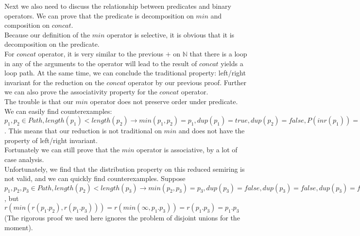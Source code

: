 \documentclass[a4paper,10pt]{article}
\begin{document}
Next we also need to discuss the relationship between predicates and binary operators. 
We can prove that the predicate is decomposition on $min$ and composition on $concat$. \\
Because our definition of the $min$ operator is selective, it is obvious that it is decomposition on the predicate. \\
For $concat$ operator, it is very similar to the previous $+$ on $\mathbb{N}$ that there is a loop in any of the arguments to the operator will lead to the result of $concat$ yields a loop path. At the same time, we can conclude the traditional property: left/right invariant for the reduction on the $concat$ operator by our previous proof. 
Further we can also prove the associativity property for the $concat$ operator.\\
The trouble is that our $min$ operator does not preserve order under predicate. 
We can easily find counterexamples: $p_1,p_2 \in Path, length (p_1) < length(p_2) \rightarrow min(p_1,p_2) = p_1, dup(p_1) = true, dup(p_2) = false, P(inr(p_1)) = true, P(inr(p_2)) = false$. 
This means that our reduction is not traditional on $min$ and does not have the property of left/right invariant.\\
Fortunately we can still prove that the $min$ operator is associative, by a lot of case analysis.\\
Unfortunately, we find that the distribution property on this reduced semiring is not valid, and we can quickly find counterexamples.
Suppose $p_1,p_2,p_3 \in Path, length (p_2) < length(p_3) \rightarrow min(p_2,p_3) = p_3, dup(p_3) = false,dup(p_3) = false,dup(p_3) = false,dup(p_1 . p_2) = true,dup(p_1 . p_3) = false, r(p_1 . r(min (p_2,p_3))) = r(p_1 . r(p_2)) = r(p_1 . p_2) = \infty$, but $r(min(r(p_1 . p_2),r(p_1 . p_3))) = r(min(\infty,p_1 . p_3)) = r(p_1 . p_3) = p_1 . p_3$ (The rigorous proof we used here ignores the problem of disjoint unions for the moment).
\medskip

 

\end{document}
